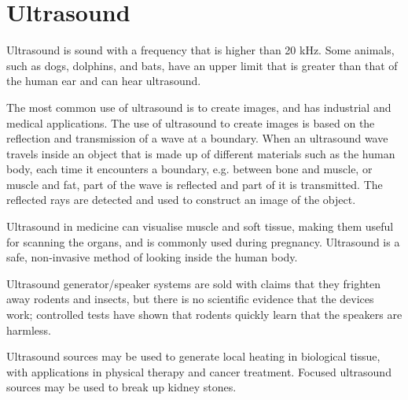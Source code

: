 \section{Ultrasound}

Ultrasound is sound with a frequency that is higher than 20 kHz. Some animals, such as dogs, dolphins, and bats, have an upper limit that is greater than that of the human ear and can hear ultrasound.

The most common use of ultrasound is to create images, and has industrial and medical applications. The use of ultrasound to create images is based on the reflection and transmission of a wave at a boundary. When an ultrasound wave travels inside an object that is made up of different materials such as the human body, each time it encounters a boundary, e.g. between bone and muscle, or muscle and fat, part of the wave is reflected and part of it is transmitted. The reflected rays are detected and used to construct an image of the object.

Ultrasound in medicine can visualise muscle and soft tissue, making them useful for scanning the organs, and is commonly used during pregnancy. Ultrasound is a safe, non-invasive method of looking inside the human body.
\begin{IFact}{Ultrasound generator/speaker systems are sold with claims that they frighten away rodents and insects, but there is no scientific evidence that the devices work; controlled tests have shown that rodents quickly learn that the speakers are harmless.
}\end{IFact}
Ultrasound sources may be used to generate local heating in biological tissue, with applications in physical therapy and cancer treatment. Focused ultrasound sources may be used to break up kidney stones.

